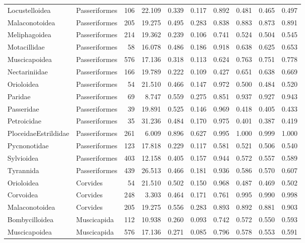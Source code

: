 \begin{table}[ht]
\begin{tabular}{llrrrrrrrr}
  Locustelloidea & Passeriformes &  106 & 22.109 & 0.339 & 0.117 & 0.892 & 0.481 & 0.465 & 0.497 \\ 
  Malaconotoidea & Passeriformes &  205 & 19.275 & 0.495 & 0.283 & 0.838 & 0.883 & 0.873 & 0.891 \\ 
  Meliphagoidea & Passeriformes &  214 & 19.362 & 0.239 & 0.106 & 0.741 & 0.524 & 0.504 & 0.545 \\ 
  Motacillidae & Passeriformes &   58 & 16.078 & 0.486 & 0.186 & 0.918 & 0.638 & 0.625 & 0.653 \\ 
  Muscicapoidea & Passeriformes &  576 & 17.136 & 0.318 & 0.113 & 0.624 & 0.763 & 0.751 & 0.778 \\ 
  Nectariniidae & Passeriformes &  166 & 19.789 & 0.222 & 0.109 & 0.427 & 0.651 & 0.638 & 0.669 \\ 
  Orioloidea & Passeriformes &   54 & 21.510 & 0.466 & 0.147 & 0.972 & 0.500 & 0.484 & 0.520 \\ 
  Paridae & Passeriformes &   69 & 8.747 & 0.559 & 0.275 & 0.851 & 0.937 & 0.927 & 0.943 \\ 
  Passeridae & Passeriformes &   39 & 19.891 & 0.525 & 0.146 & 0.969 & 0.418 & 0.405 & 0.433 \\ 
  Petroicidae & Passeriformes &   35 & 31.236 & 0.484 & 0.170 & 0.975 & 0.401 & 0.387 & 0.419 \\ 
  PloceidaeEstrildidae & Passeriformes &  261 & 6.009 & 0.896 & 0.627 & 0.995 & 1.000 & 0.999 & 1.000 \\ 
  Pycnonotidae & Passeriformes &  123 & 17.818 & 0.229 & 0.117 & 0.581 & 0.521 & 0.506 & 0.540 \\ 
  Sylvioidea & Passeriformes &  403 & 12.158 & 0.405 & 0.157 & 0.944 & 0.572 & 0.557 & 0.589 \\ 
  Tyrannida & Passeriformes &  439 & 26.513 & 0.466 & 0.181 & 0.936 & 0.586 & 0.570 & 0.607 \\ 
  Orioloidea & Corvides &   54 & 21.510 & 0.502 & 0.150 & 0.968 & 0.487 & 0.469 & 0.502 \\ 
  Corvoidea & Corvides &  248 & 3.303 & 0.464 & 0.171 & 0.761 & 0.995 & 0.990 & 0.998 \\ 
  Malaconotoidea & Corvides &  205 & 19.275 & 0.556 & 0.283 & 0.893 & 0.892 & 0.881 & 0.903 \\ 
  Bombycilloidea & Muscicapida &  112 & 10.938 & 0.260 & 0.093 & 0.742 & 0.572 & 0.550 & 0.593 \\ 
  Muscicapoidea & Muscicapida &  576 & 17.136 & 0.271 & 0.085 & 0.796 & 0.578 & 0.553 & 0.591 \\ 

\end{tabular}
\end{table}
